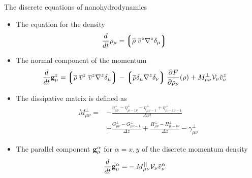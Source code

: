 \documentclass{beamer}
\newcommand{\llg}{\left\lgroup}
\newcommand{\rlg}{\right\rgroup}
\begin{document}
\begin{frame}{The discrete equations of nanohydrodynamics}
  \begin{itemize}
    \item The equation for the \alert{density}
      \begin{align}
\frac{d}{dt}\rho_\mu=&  \llg\overline{\rho} \; \overline{v}^{z}{\nabla}^{z}\delta_\mu \rlg
        \nonumber
      \end{align}
    \item The \alert{normal component of the momentum}
      \begin{align}
    \frac{d}{dt}{{\bf g}}^{z}_\mu=&
\llg\overline{\rho}\; \overline{v}^{z}\;\overline{v}^{z}{\nabla}^{z}\delta_{\mu}\rlg
-\llg\overline{\rho}\delta_{\mu}{\nabla}^{z}\delta_{\nu}\rlg
\frac{\partial  F}{\partial \rho_{\nu}}(\rho)
+M_{\mu\nu}^{\bot}{\cal V}_\nu\tilde{v}^{z}_\nu
\nonumber
\end{align}
\item The dissipative matrix is defined as
\begin{align}
M^{\bot}_{\mu\nu} 
=&-\frac{\eta^\bot_{\mu\nu}-\eta^\bot_{\mu-1\nu}-\eta^\bot_{\mu\nu-1}+\eta^\bot_{\mu-1\nu-1}}{\Delta z^2}
\nonumber \\
&+\frac{{G}^\bot_{\mu\nu}-{G}^\bot_{\mu\nu-1}}{\Delta z}
+\frac{{H}^\bot_{\mu\nu}-{H}^\bot_{\mu-1\nu}}{\Delta z}
-{\gamma}^\bot_{\mu\nu}
\nonumber
\end{align}

\item The \alert{parallel component}  ${\bf g}^\alpha_\mu$ for $\alpha
=x,y$  of  the  discrete  momentum density
\begin{align}
    \frac{d}{dt}{{\bf g}}^\alpha_\mu=&-M_{\mu\nu}^{||}{\cal V}_\nu\tilde{v}^\alpha_\nu
\nonumber
\end{align}
\end{itemize}  
\end{frame}
\end{document}
